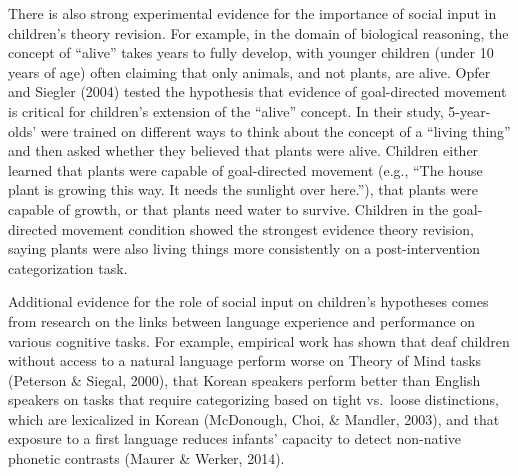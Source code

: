 \documentclass[english,floatsintext,man]{apa6}
\theoremstyle{definition}
\theoremstyle{definition}
\theoremstyle{definition}
\theoremstyle{remark}
\begin{document}
There is also strong experimental evidence for the importance of social
input in children's theory revision. For example, in the domain of
biological reasoning, the concept of \enquote{alive} takes years to
fully develop, with younger children (under 10 years of age) often
claiming that only animals, and not plants, are alive. Opfer and Siegler
(2004) tested the hypothesis that evidence of goal-directed movement is
critical for children's extension of the \enquote{alive} concept. In
their study, 5-year-olds' were trained on different ways to think about
the concept of a \enquote{living thing} and then asked whether they
believed that plants were alive. Children either learned that plants
were capable of goal-directed movement (e.g., \enquote{The house plant
is growing this way. It needs the sunlight over here.}), that plants
were capable of growth, or that plants need water to survive. Children
in the goal-directed movement condition showed the strongest evidence
theory revision, saying plants were also living things more consistently
on a post-intervention categorization task.

Additional evidence for the role of social input on children's
hypotheses comes from research on the links between language experience
and performance on various cognitive tasks. For example, empirical work
has shown that deaf children without access to a natural language
perform worse on Theory of Mind tasks (Peterson \& Siegal, 2000), that
Korean speakers perform better than English speakers on tasks that
require categorizing based on tight vs.~loose distinctions, which are
lexicalized in Korean (McDonough, Choi, \& Mandler, 2003), and that
exposure to a first language reduces infants' capacity to detect
non-native phonetic contrasts (Maurer \& Werker, 2014).
\end{document}
